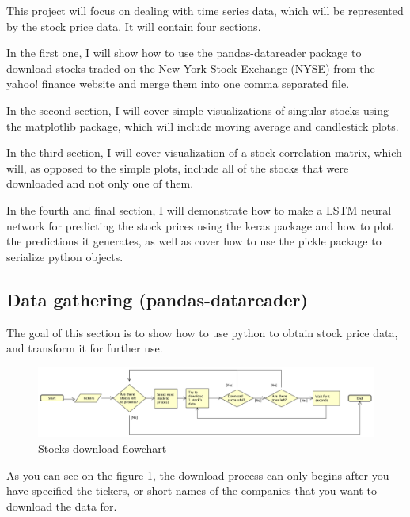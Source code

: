 \documentclass[12pt, a4paper]{article}
\begin{document}
This project will focus on dealing with time series data, which will be represented by the stock price data. It will contain four sections.

In the first one, I will show how to use the pandas-datareader package to download stocks traded on the New York Stock Exchange (NYSE) from the yahoo! finance website and merge them into one comma separated file.

In the second section, I will cover simple visualizations of singular stocks using the matplotlib package, which will include moving average and candlestick plots.

In the third section, I will cover visualization of a stock correlation matrix, which will, as opposed to the simple plots, include all of the stocks that were downloaded and not only one of them.

In the fourth and final section, I will demonstrate how to make a LSTM neural network for predicting the stock prices using the keras package and how to plot the predictions it generates, as well as cover how to use the pickle package to serialize python objects.


\newpage
\subsection{Data gathering (pandas-datareader)}


The goal of this section is to show how to use python to obtain stock price data, and transform it for further use.


\begin{figure}[H]
    \centering
    \includegraphics[width=\textwidth]{src/stocks/etl/stocks_download_chart}
    \caption{Stocks download flowchart}
    \label{fig:stocks_download_chart}
\end{figure}

As you can see on the figure \ref{fig:stocks_download_chart}, the download process can only begins after you have specified the tickers, or short names of the companies that you want to download the data for.
\end{document}
